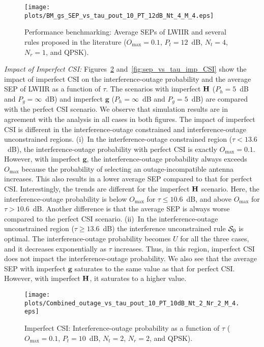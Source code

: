 \documentclass[12pt,draftcls,peerreview,onecolumn]{IEEEtran}
\newcommand{\mtx}[1]{{\bf #1}} %
\newcommand{\Nt}{{N_t}}
\newcommand{\Nr}{{N_r}}
\newcommand{\Pt}{{P_t}}
\newcommand{\puch}{g}
\newcommand{\g}{\mathbf{\puch}}
\newcommand{\outmax}{O_{\text{max}}}
\newcommand{\itau}{\tau}
\newcommand{\un}{U}
\newcommand{\Hmx}{\mtx{H}}
\newcommand{\caluncons}{{\cal S_{\text{0}}}}
\newcommand{\gpilotpower}{P_g}
\newcommand{\hpilotpower}{P_h}
\begin{document}
\begin{figure}
	\centering \texttt{[image: plots/BM\_gs\_SEP\_vs\_tau\_pout\_10\_PT\_12dB\_Nt\_4\_M\_4.eps]}
	\caption{Performance benchmarking: Average SEPs of LWIIR and several rules proposed in the literature ($\outmax = 0.1$, $\Pt = 12$~dB, $\Nt = 4$, $\Nr=1$, and QPSK).}
	\label{fig:BM_SEP_vs_tau}
\end{figure}


{\em Impact of Imperfect CSI:} Figures~\ref{fig:out_vs_tau_imp_CSI} and~\ref{fig:sep_vs_tau_imp_CSI} show the impact of imperfect CSI on the interference-outage probability and the average SEP of LWIIR as a function of $\tau$. The scenarios with imperfect $\Hmx$ ($\hpilotpower=5$~dB and $\gpilotpower=\infty$~dB) and imperfect $\g$ ($\hpilotpower=\infty$~dB and $\gpilotpower=5$~dB) are compared with the perfect CSI scenario. We observe that simulation results are in agreement with the analysis in all cases in both figures. The impact of imperfect CSI is different in the interference-outage constrained and interference-outage unconstrained regions. (i)~In the interference-outage constrained region ($\itau<13.6$~dB), the interference-outage probability with perfect CSI is exactly $\outmax=0.1$. However, with imperfect $\g$, the interference-outage probability always exceeds  $\outmax$ because the probability of selecting an outage-incompatible antenna increases. This also results in a  lower average SEP compared to that for perfect CSI. Interestingly, the trends are different for the imperfect $\Hmx$ scenario. Here, the interference-outage probability is below $\outmax$ for $\itau\leq10.6$~dB, and above $\outmax$ for $\itau>10.6$~dB. Another difference is that the average SEP is always worse compared to the perfect CSI scenario. (ii)~In the interference-outage unconstrained region ($\itau \geq 13.6$~dB)    
the interference unconstrained rule $\caluncons$ is optimal. The interference-outage probability becomes $\un$ for all the three cases, and it decreases exponentially as $\itau$ increases. Thus, in this region, imperfect CSI does not impact the interference-outage probability. We also see that the average SEP with imperfect $\g$ saturates to the same value as that for perfect CSI. However, with imperfect $\Hmx$, it saturates to a higher value. %

\begin{figure}
	\centering
	 \texttt{[image: plots/Combined\_outage\_vs\_tau\_pout\_10\_PT\_10dB\_Nt\_2\_Nr\_2\_M\_4.eps]}
	\caption{Imperfect CSI: Interference-outage probability as a function of $\itau$ ($\outmax=0.1$, $\Pt = 10$~dB, $\Nt = 2$, $\Nr = 2$, and QPSK).}
	\label{fig:out_vs_tau_imp_CSI}
\end{figure}
\end{document}

